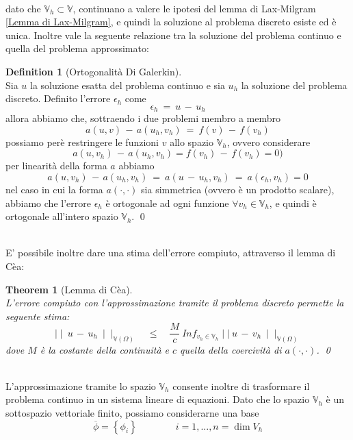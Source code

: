 \documentclass[12pt,a4paper]{report}
\theoremstyle{theorem}
\newtheorem{theorem}{Theorem}[section]
\theoremstyle{theorem}
\theoremstyle{definition}
\newtheorem{definition}{Definition}[section]
\begin{document}
\hfill \\
dato che $\mathbb{V}_{h} \subset \mathbb{V}$, continuano a valere le ipotesi del lemma di Lax-Milgram \ref{Lemma di Lax-Milgram}, e quindi la soluzione al problema discreto esiste ed è unica. Inoltre vale la seguente relazione tra la soluzione del problema continuo e quella del problema approssimato:
\begin{definition} [Ortogonalità Di Galerkin]  \label{Galerkin Orthogonality}
\hfill \\
Sia $u$ la soluzione esatta del problema continuo e sia $u_{h}$ la soluzione del problema discreto. Definito l'errore $\epsilon_{h}$ come
\[ \epsilon_{h} \ = \ u \, - \, u_{h} \]
allora abbiamo che, sottraendo i due problemi membro a membro
\[ a(u,v) \, - \, a(u_{h}, v_{h}) \ =  \ f(v) \, - \, f(v_{h}) \]
possiamo perè restringere le funzioni $v$ allo spazio $\mathbb{V}_h$, ovvero considerare
\[ a(u,v_{h}) \, - \, a(u_{h}, v_{h}) = f(v_{h}) \, - \, f(v_{h}) = 0) \]
per linearità della forma $a$ abbiamo
\[ a(u,v_{h}) \, - \, a(u_{h}, v_{h}) \ =  \ a(u \, - \, u_{h}, v_{h}) \ =  \ a(\epsilon_{h},v_{h}) = 0 \]
nel caso in cui la forma $a(\cdot,\cdot)$ sia simmetrica (ovvero è un prodotto scalare), abbiamo che l'errore $\epsilon_{h}$ è ortogonale ad ogni funzione $\forall v_{h} \in \mathbb{V}_{h}$, e quindi è ortogonale all'intero spazio $\mathbb{V}_{h}$.
\qed
\end{definition}
\hfill \\
E' possibile inoltre dare una stima dell'errore compiuto, attraverso il lemma di Cèa:
\begin{theorem} [Lemma di Cèa]  \label{Lemma Di Cea}
\hfill \\
L'errore compiuto con l'approssimazione tramite il problema discreto permette la seguente stima:
\[ \mid \mid \ u \, - \, u_{h} \ \mid \mid_{\mathbb{V}(\Omega)} \quad \leq \quad \frac{M}{c} \ Inf_{v_{h} \in \mathbb{V}_{h}} \mid \mid \ u \, - \, v_{h} \ \mid \mid_{\mathbb{V}(\Omega)} \]
dove $M$ è la costante della continuità e $c$ quella della coercività di $a(\cdot,\cdot)$.
\qed
\end{theorem}
\hfill \\
L'approssimazione tramite lo spazio $\mathbb{V}_{h}$ consente inoltre di trasformare il problema continuo in un sistema lineare di equazioni. Dato che lo spazio $\mathbb{V}_{h}$ è un sottospazio vettoriale finito, possiamo considerarne una base
\[ \overline{\phi} = \left \{ \phi_{i} \right \} \qquad \qquad i = 1,..., n = \dim{V_{h}} \]
\end{document}
